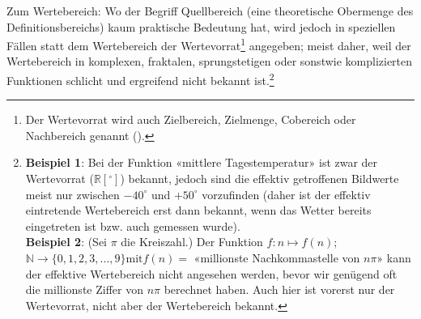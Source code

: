 


\begin{bemerkung}{}{}
  Zum Wertebereich: Wo der Begriff Quellbereich (eine theoretische Obermenge
  des Definitionsbereichs) kaum praktische Bedeutung hat,
  wird jedoch in speziellen Fällen statt dem Wertebereich der
  Wertevorrat\footnote{Der Wertevorrat
    wird auch Zielbereich, Zielmenge,
    Cobereich oder Nachbereich
    genannt (\cite{FormelnUndTafeln19}).}
  angegeben; meist daher, weil der
  Wertebereich in komplexen, fraktalen, sprungstetigen oder sonstwie komplizierten Funktionen schlicht
  und ergreifend nicht bekannt ist.\footnote{\textbf{Beispiel 1}: Bei der Funktion
    «mittlere Tagestemperatur» ist zwar der Wertevorrat ($\mathbb{R}[{}^\circ]$)
    bekannt, jedoch sind die effektiv getroffenen Bildwerte meist nur
    zwischen $-40^\circ$ und $+50^\circ$ vorzufinden (daher ist der
    effektiv eintretende Wertebereich erst dann bekannt, wenn das Wetter
    bereits eingetreten ist bzw. auch gemessen wurde). \\
    \textbf{Beispiel 2}: (Sei $\pi$ die Kreiszahl.) Der Funktion $f: n\mapsto f(n)$; $\mathbb{N} \rightarrow \{0, 1, 2, 3, ..., 9\} \text{mit} f(n) = $
    «millionste Nachkommastelle von $n\pi$»
    kann der effektive Wertebereich nicht
  angesehen werden, bevor wir genügend oft die millionste Ziffer von
  $n\pi$ berechnet haben. Auch hier ist vorerst nur der Wertevorrat, nicht
  aber der Wertebereich bekannt.}
\end{bemerkung}



